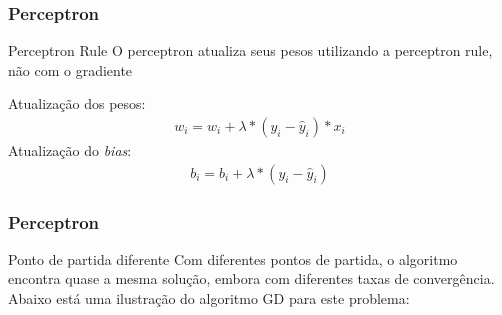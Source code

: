 \documentclass{beamer}
\begin{document}
\begin{frame}
	\frametitle{Perceptron}
	\begin{block}{Perceptron Rule}
		O perceptron atualiza seus pesos utilizando a perceptron rule, não com o gradiente
	\end{block}
	Atualização dos pesos:
	\begin{gather*}
		w_i = w_i + \lambda*(y_i -  \hat{y}_i)* x_i
	\end{gather*}
	Atualização do \textit{bias}:
	\begin{gather*}
		b_i = b_i + \lambda*(y_i -  \hat{y}_i)
	\end{gather*}

	
\end{frame}

\begin{frame}
	\frametitle{Perceptron}
	\begin{block}{Ponto de partida diferente}
		Com diferentes pontos de partida, o algoritmo encontra quase a mesma solução, embora com diferentes taxas de convergência. Abaixo está uma ilustração do algoritmo GD para este problema:
		
		\href{https://github.com/mafaldasalomao/pavic_treinamento_ml/blob/main/Machine\%20Learning/figures/random_01.gif?raw=true}{} \\
		\href{https://github.com/mafaldasalomao/pavic_treinamento_ml/blob/main/Machine\%20Learning/figures/random_02.gif?raw=true}{}
	\end{block}
\end{frame}
\end{document}
